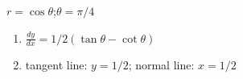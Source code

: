 {$r=\cos\theta$;\quad $\theta = \pi/4$}
{\begin{enumerate}
	\item $\frac{dy}{dx} = 1/2(\tan \theta-\cot\theta)$
	\item	tangent line: $y=1/2$; normal line: $x=1/2$
\end{enumerate}}

